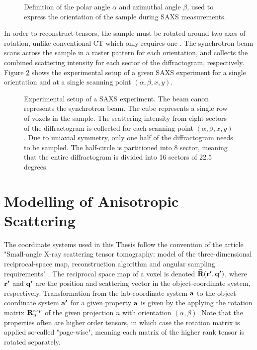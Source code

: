 \begin{figure}[h!]
    \centering
    
    \caption{Definition of the polar angle $\alpha$ and azimuthal angle $\beta$, used to express the orientation of the sample during SAXS measurements.}
    \label{fig:orientations}
\end{figure}

In order to reconstruct tensors, the sample must be rotated around two axes of rotation, unlike conventional CT which only requires one \cite{liebi2018small}.
The synchrotron beam scans across the sample in a raster pattern for each orientation, and collects the combined scattering intensity for each sector of the diffractogram, respectively.
Figure \ref{fig:experimental_setup} shows the experimental setup of a given SAXS experiment for a single orientation and at a single scanning point $(\alpha, \beta,x,y)$.

\begin{figure}
    \centering
    
    \caption{Experimental setup of a SAXS experiment. The beam canon represents the synchrotron beam. The cube represents a single row of voxels in the sample.
        The scattering intensity from eight sectors of the diffractogram is collected for each scanning point $(\alpha, \beta,x,y)$.
        Due to uniaxial symmetry, only one half of the diffractogram needs to be sampled. The half-circle is partitioned into 8 sector, meaning that the entire diffractogram is divided into 16 sectors of 22.5 degrees.}
    \label{fig:experimental_setup}
\end{figure}



\section{Modelling of Anisotropic Scattering}
The coordinate systems used in this Thesis follow the convention of the article "Small-angle X-ray scattering tensor tomography:
model of the three-dimensional reciprocal-space
map, reconstruction algorithm and angular
sampling requirements" \cite{liebi2018small}.
The reciprocal space map of a voxel is denoted $\bm{\mathrm{\widehat{R}}}(\bm{\mathrm{r'}}, \bm{\mathrm{q'}})$,
where $\bm{\mathrm{r'}}$ and $\bm{\mathrm{q'}}$ are the position and scattering vector in the object-coordinate system, respectively.
Transformation from the lab-coordinate system $\bm{\mathrm{a}}$ to the object-coordinate system $\bm{\mathrm{a'}}$ for a given property $\bm{\mathrm{a}}$
is given by the applying the rotation matrix $\bm{\mathrm{R}}_{n}^{exp}$ of the given projection $n$ with orientation $\left(\alpha,\beta\right)$.
Note that the properties often are higher order tensors, in which case the rotation matrix is applied so-called "page-wise",
meaning each matrix of the higher rank tensor is rotated separately.

